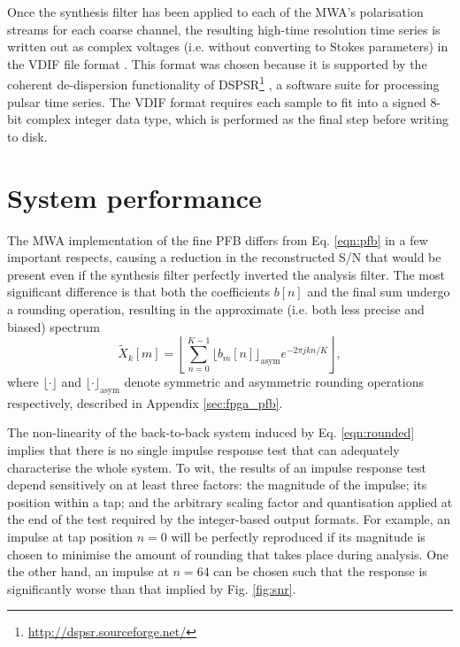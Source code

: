 \documentclass{pasa}%
\begin{document}
Once the synthesis filter has been applied to each of the MWA's polarisation streams for each coarse channel, the resulting high-time resolution time series is written out as complex voltages (i.e. without converting to Stokes parameters) in the VDIF file format \citep{Whitney2009}.
This format was chosen because it is supported by the coherent de-dispersion functionality of DSPSR\footnote{\url{http://dspsr.sourceforge.net/}} \citep{VanStraten2011b}, a software suite for processing pulsar time series.
The VDIF format requires each sample to fit into a signed 8-bit complex integer data type, which is performed as the final step before writing to disk.

\section{System performance}

The MWA implementation of the fine PFB differs from Eq. \eqref{eqn:pfb} in a few important respects, causing a reduction in the reconstructed S/N that would be present even if the synthesis filter perfectly inverted the analysis filter.
The most significant difference is that both the coefficients $b[n]$ and the final sum undergo a rounding operation, resulting in the approximate (i.e. both less precise and biased) spectrum
\begin{equation}
    \tilde{X}_k[m] = \left\lfloor\sum_{n=0}^{K-1} \bigg\lfloor b_m[n] \bigg\rfloor_{\text{asym}} e^{-2\pi jkn/K}\right\rfloor,
    \label{eqn:rounded}
\end{equation}
where $\lfloor\cdot\rfloor$ and $\lfloor\cdot\rfloor_{\text{asym}}$ denote symmetric and asymmetric rounding operations respectively, described in Appendix \ref{sec:fpga_pfb}.

The non-linearity of the back-to-back system induced by Eq. \eqref{eqn:rounded} implies that there is no single impulse response test that can adequately characterise the whole system.
To wit, the results of an impulse response test depend sensitively on at least three factors: the magnitude of the impulse; its position within a tap; and the arbitrary scaling factor and quantisation applied at the end of the test required by the integer-based output formats.
For example, an impulse at tap position $n = 0$ will be perfectly reproduced if its magnitude is chosen to minimise the amount of rounding that takes place during analysis.
One the other hand, an impulse at $n = 64$ can be chosen such that the response is significantly worse than that implied by Fig. \ref{fig:snr}.
\end{document}
